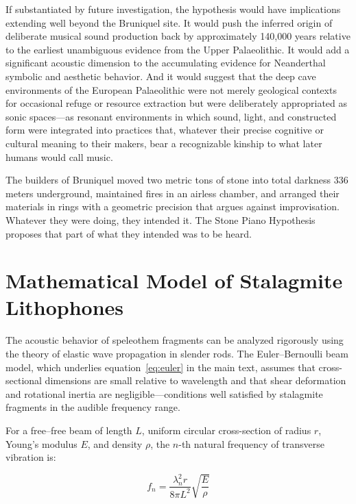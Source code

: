 \documentclass[12pt]{article}
\begin{document}
If substantiated by future investigation, the hypothesis would have implications extending well beyond the Bruniquel site. It would push the inferred origin of deliberate musical sound production back by approximately 140,000 years relative to the earliest unambiguous evidence from the Upper Palaeolithic. It would add a significant acoustic dimension to the accumulating evidence for Neanderthal symbolic and aesthetic behavior. And it would suggest that the deep cave environments of the European Palaeolithic were not merely geological contexts for occasional refuge or resource extraction but were deliberately appropriated as sonic spaces—as resonant environments in which sound, light, and constructed form were integrated into practices that, whatever their precise cognitive or cultural meaning to their makers, bear a recognizable kinship to what later humans would call music.

The builders of Bruniquel moved two metric tons of stone into total darkness 336 meters underground, maintained fires in an airless chamber, and arranged their materials in rings with a geometric precision that argues against improvisation. Whatever they were doing, they intended it. The Stone Piano Hypothesis proposes that part of what they intended was to be heard.



\appendix

\section{Mathematical Model of Stalagmite Lithophones}

The acoustic behavior of speleothem fragments can be analyzed rigorously using the theory of elastic wave propagation in slender rods. The Euler--Bernoulli beam model, which underlies equation~\eqref{eq:euler} in the main text, assumes that cross-sectional dimensions are small relative to wavelength and that shear deformation and rotational inertia are negligible—conditions well satisfied by stalagmite fragments in the audible frequency range.

For a free--free beam of length $L$, uniform circular cross-section of radius $r$, Young's modulus $E$, and density $\rho$, the $n$-th natural frequency of transverse vibration is:

\begin{equation}
f_n = \frac{\lambda_n^2 r}{8\pi L^2}\sqrt{\frac{E}{\rho}}
\end{equation}
\end{document}

